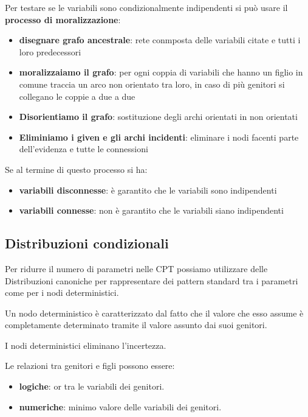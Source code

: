 Per testare se le variabili sono condizionalmente indipendenti si può usare il 
\textbf{processo di moralizzazione}:
\begin{itemize}
    \item \textbf{disegnare grafo ancestrale}: rete conmposta delle variabili citate e tutti i
          loro predecessori
    \item \textbf{moralizzaiamo il grafo}: per ogni coppia di variabili che hanno un 
            figlio in comune traccia un arco non orientato tra loro, in caso di più
            genitori si collegano le coppie a due a due
    \item \textbf{Disorientiamo il grafo}: sostituzione degli archi orientati in non orientati
    \item \textbf{Eliminiamo i given e gli archi incidenti}: eliminare i nodi 
    facenti parte dell'evidenza e tutte le connessioni
\end{itemize}
Se al termine di questo processo si ha:
\begin{itemize}
    \item \textbf{variabili disconnesse}: è garantito che le variabili sono indipendenti
    \item \textbf{variabili connesse}: non è garantito che le variabili siano indipendenti
\end{itemize}

\subsection{Distribuzioni condizionali}
Per ridurre il numero di parametri nelle CPT possiamo utilizzare delle Distribuzioni
canoniche per rappresentare dei pattern standard tra i parametri come per i nodi deterministici.

\begin{definizione}
    Un nodo deterministico è caratterizzato dal fatto che il valore che esso assume 
    è completamente determinato tramite il valore assunto dai suoi genitori.
\end{definizione}

I nodi deterministici eliminano l'incertezza.

Le relazioni tra genitori e figli possono essere:
\begin{itemize}
    \item \textbf{logiche}: or tra le variabili dei genitori.
    \item \textbf{numeriche}: minimo valore delle variabili dei genitori. 
\end{itemize}

